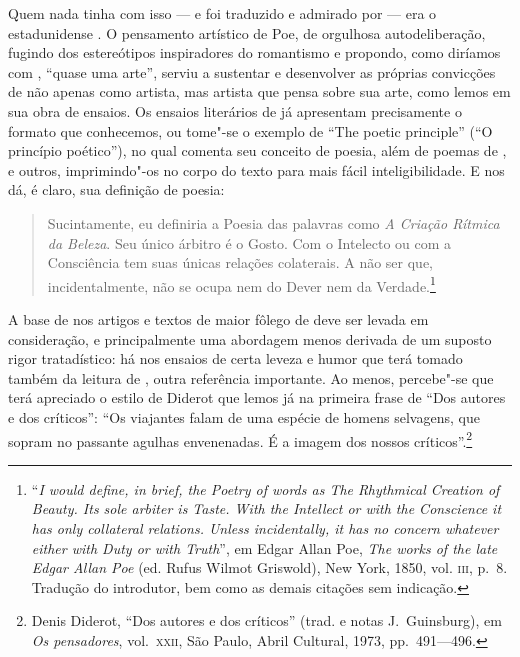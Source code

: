 Quem nada tinha com isso --- e foi traduzido e admirado por 
--- era o estadunidense . 
O pensamento artístico de Poe, de orgulhosa autodeliberação,
fugindo dos estereótipos inspiradores do romantismo e propondo, como
diríamos com , “quase uma arte”, serviu a sustentar e
desenvolver as próprias convicções de  não apenas como
artista, mas artista que pensa sobre sua arte, como lemos em sua obra
de ensaios. Os ensaios literários de  já apresentam precisamente o
formato que conhecemos, ou tome"-se o exemplo de “The poetic principle”
(``O princípio poético''), no qual comenta seu conceito de poesia, além de
poemas de ,  e outros, imprimindo"-os no corpo do texto para
mais fácil inteligibilidade. E nos dá, é claro, sua definição de
poesia:

\begin{quote}
Sucintamente, eu definiria a Poesia das palavras como
\textit{A Criação Rítmica da Beleza}. Seu único árbitro é o Gosto. Com
o Intelecto ou com a Consciência tem suas únicas relações colaterais. A
não ser que, incidentalmente, não se ocupa nem do Dever nem da Verdade.\footnote{ ``\textit{I 
would define, in brief, the Poetry of words as \textit{The Rhythmical
Creation of Beauty.} Its sole arbiter is Taste. With the Intellect or
with the Conscience it has only collateral relations. Unless
incidentally, it has no concern whatever either with Duty or with
Truth}'',
em Edgar Allan Poe, \textit{The works of the late Edgar
Allan Poe} (ed. Rufus Wilmot Griswold), New York, 1850,  vol. \textsc{iii}, p.~8. 
Tradução do introdutor, bem como as demais citações sem indicação.}
\end{quote}

A base de  nos artigos e textos de maior fôlego de  deve
ser levada em consideração, e principalmente uma abordagem menos
derivada de um suposto rigor tratadístico: há nos ensaios de 
certa leveza e humor que terá tomado também da leitura de ,
outra referência importante. Ao menos, percebe"-se que  terá
apreciado o estilo de Diderot que lemos já na primeira frase de “Dos
autores e dos críticos”: “Os viajantes falam de uma espécie de homens
selvagens, que sopram no passante agulhas envenenadas. É a imagem dos
nossos críticos”.\footnote{ Denis Diderot, “Dos autores e dos críticos”
(trad. e notas J.~Guinsburg), em \textit{Os
pensadores}, vol.~\textsc{xxii}, São Paulo, Abril Cultural, 1973, pp.~491---496.}

